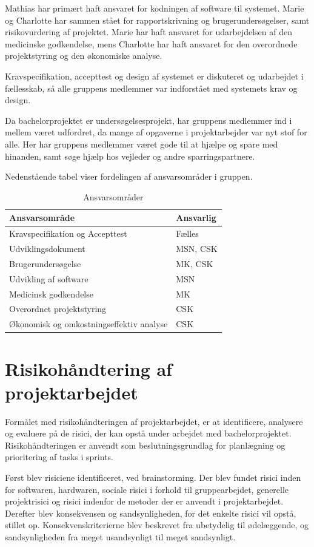 Mathias har primært haft ansvaret for kodningen af software til systemet. Marie og Charlotte har sammen stået for rapportskrivning og brugerundersøgelser, samt risikovurdering af projektet. Marie har haft ansvaret for udarbejdelsen af den medicinske godkendelse, mens Charlotte har haft ansvaret for den overordnede projektstyring og den økonomiske analyse. 

Kravspecifikation, accepttest og design af systemet er diskuteret og udarbejdet i fællesskab, så alle gruppens medlemmer var indforstået med systemets krav og design. 

Da bachelorprojektet er undersøgelsesprojekt, har gruppens medlemmer ind i mellem været udfordret, da mange af opgaverne i projektarbejder var nyt stof for alle. Her har gruppens medlemmer været gode til at hjælpe og spare med hinanden, samt søge hjælp hos vejleder og andre sparringspartnere.  

Nedenstående tabel viser fordelingen af ansvarsområder i gruppen. 

\begin{table}[h]
\centering
\begin{tabular}{|l| p{}|}
\hline
\textbf{Ansvarsområde} &  \textbf{Ansvarlig} \\\hline
Kravspecifikation og Accepttest & Fælles \\\hline
Udviklingsdokument & MSN, CSK\\\hline
Brugerundersøgelse & MK, CSK \\\hline
Udvikling af software & MSN\\\hline
Medicinsk godkendelse & MK \\\hline
Overordnet projektstyring & CSK \\\hline
Økonomisk og omkostningseffektiv analyse & CSK \\\hline
\end{tabular}
\caption{Ansvarsområder}
\end{table}

\section{Risikohåndtering af projektarbejdet}
Formålet med risikohåndteringen af projektarbejdet, er at identificere, analysere og evaluere på de risici, der kan opstå under arbejdet med bachelorprojektet. Risikohåndteringen er anvendt som beslutningsgrundlag for planlægning og prioritering af tasks i sprints.  

Først blev risiciene identificeret, ved brainstorming. Der blev fundet risici inden for softwaren, hardwaren, sociale risici i forhold til gruppearbejdet, generelle projektrisici og risici indenfor de metoder der er anvendt i projektarbejdet. Derefter blev konsekvensen og sandsynligheden, for det enkelte risici vil opstå, stillet op. Konsekvenskriterierne blev beskrevet fra ubetydelig til ødelæggende, og sandsynligheden fra meget usandsynligt til meget sandsynligt. 

